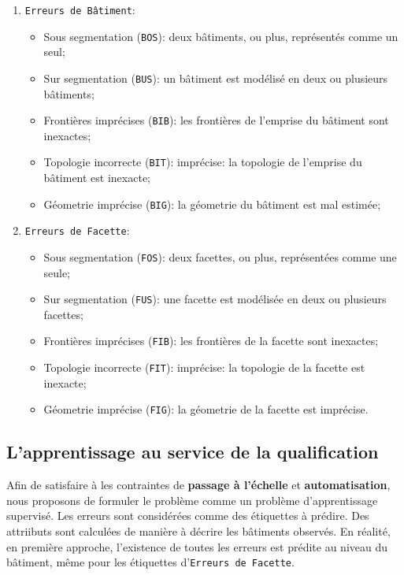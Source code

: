         \begin{enumerate}
            \item \texttt{Erreurs de Bâtiment}:
            \begin{itemize}
                \item Sous segmentation (\texttt{BOS}): deux bâtiments, ou plus, représentés comme un seul;
                \item Sur segmentation (\texttt{BUS}): un bâtiment est modélisé en deux ou plusieurs bâtiments;
                \item Frontières imprécises (\texttt{BIB}): les frontières de l'emprise du bâtiment sont inexactes;
                \item Topologie incorrecte (\texttt{BIT}): imprécise: la topologie de l'emprise du bâtiment est inexacte;
                \item Géometrie imprécise (\texttt{BIG}): la géometrie du bâtiment est mal estimée;
            \end{itemize}
            \item \texttt{Erreurs de Facette}:
            \begin{itemize}
                \item Sous segmentation (\texttt{FOS}): deux facettes, ou plus, représentées comme une seule;
                \item Sur segmentation (\texttt{FUS}): une facette est modélisée en deux ou plusieurs facettes;
                \item Frontières imprécises (\texttt{FIB}): les frontières de la facette sont inexactes;
                \item Topologie incorrecte (\texttt{FIT}): imprécise: la topologie de la facette est inexacte;
                \item Géometrie imprécise (\texttt{FIG}): la géometrie de la facette est imprécise.
            \end{itemize}
        \end{enumerate}

    \subsection*{L'apprentissage au service de la qualification}
        Afin de satisfaire à les contraintes de \textbf{passage à l'échelle} et \textbf{automatisation}, nous proposons de formuler le problème comme un problème d'apprentissage supervisé.
        Les erreurs sont considérées comme des étiquettes à prédire.
        Des attriibuts sont calculées de manière à décrire les bâtiments observés.
        En réalité, en première approche, l'existence de toutes les erreurs est prédite au niveau du bâtiment, même pour les étiquettes d'\texttt{Erreurs de Facette}.\\
        
